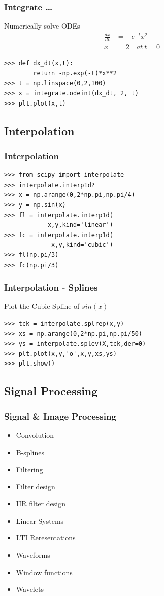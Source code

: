 \documentclass[14pt,compress]{beamer}
\newcounter{time}
\newcommand{\inctime}[1]{\addtocounter{time}{#1}{\tiny \thetime\ m}}
\begin{document}
\begin{frame}[fragile]
  \frametitle{Integrate \ldots}
  Numerically solve ODEs\\
  \begin{align*}
  \frac{dx}{dt}&=-e^{-t}x^2\\ 
           x&=2 \quad at \ t=0
  \end{align*}
  \begin{lstlisting}
>>> def dx_dt(x,t):
        return -np.exp(-t)*x**2
>>> t = np.linspace(0,2,100)
>>> x = integrate.odeint(dx_dt, 2, t)
>>> plt.plot(x,t)
  \end{lstlisting}
\inctime{10}
\end{frame}

\subsection{Interpolation}
\begin{frame}[fragile]
  \frametitle{Interpolation}
  \begin{lstlisting}
>>> from scipy import interpolate
>>> interpolate.interp1d?
>>> x = np.arange(0,2*np.pi,np.pi/4)
>>> y = np.sin(x)
>>> fl = interpolate.interp1d(
            x,y,kind='linear')
>>> fc = interpolate.interp1d(
             x,y,kind='cubic')
>>> fl(np.pi/3)
>>> fc(np.pi/3)
  \end{lstlisting}
\end{frame}

\begin{frame}[fragile]
  \frametitle{Interpolation - Splines}
  Plot the Cubic Spline of $sin(x)$
  \begin{lstlisting}
>>> tck = interpolate.splrep(x,y)
>>> xs = np.arange(0,2*np.pi,np.pi/50)
>>> ys = interpolate.splev(X,tck,der=0)
>>> plt.plot(x,y,'o',x,y,xs,ys)
>>> plt.show()
  \end{lstlisting}
\inctime{10}
\end{frame}

\subsection{Signal Processing}
\begin{frame}[fragile]
  \frametitle{Signal \& Image Processing}
    \begin{itemize}
     \item Convolution
     \item B-splines
     \item Filtering
     \item Filter design
     \item IIR filter design
     \item Linear Systems
     \item LTI Reresentations
     \item Waveforms
     \item Window functions
     \item Wavelets
    \end{itemize}
\end{frame}
\end{document}
